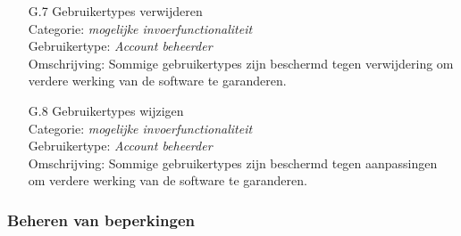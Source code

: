 \documentclass{article}
\begin{document}
\begin{itemize}
\item[G.7] Gebruikertypes verwijderen \\
Categorie: \textit{mogelijke invoerfunctionaliteit} \\
Gebruikertype: \textit{Account beheerder} \\
Omschrijving: Sommige gebruikertypes zijn beschermd tegen verwijdering om verdere werking van de software te garanderen. \\[-3mm]

\item[G.8] Gebruikertypes wijzigen \\
Categorie: \textit{mogelijke invoerfunctionaliteit} \\
Gebruikertype: \textit{Account beheerder} \\
Omschrijving: Sommige gebruikertypes zijn beschermd tegen aanpassingen om verdere werking van de software te garanderen. \\[-3mm]
\end{itemize}

\subsubsection{Beheren van beperkingen}
\end{document}
